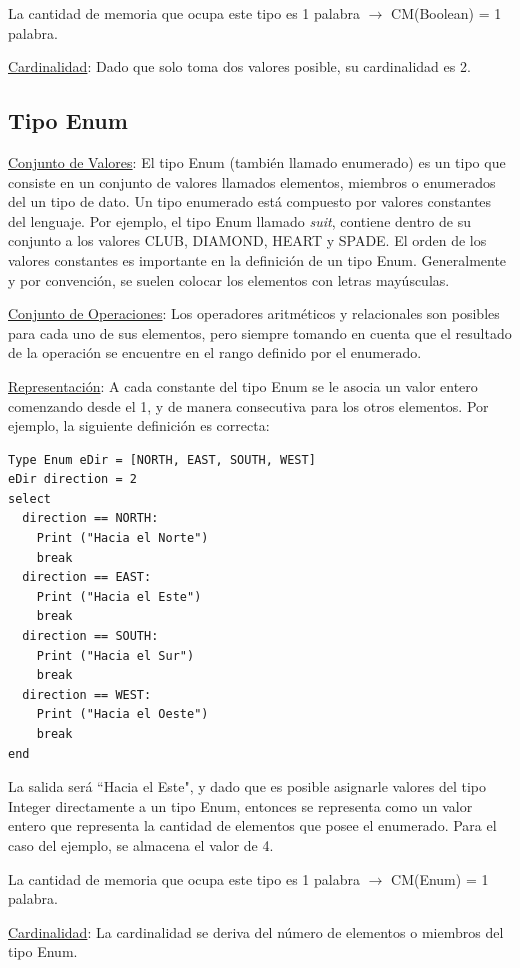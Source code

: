 La cantidad de memoria que ocupa este tipo es 1 palabra $\rightarrow$ CM(Boolean) = 1 palabra.

\underline{Cardinalidad}: Dado que solo toma dos valores posible, su cardinalidad es 2.

\subsection{Tipo Enum}

\underline{Conjunto de Valores}: El tipo Enum (también llamado enumerado) es un tipo que consiste en un conjunto de valores llamados elementos, miembros o enumerados del un tipo de dato. Un tipo enumerado está compuesto por valores constantes del lenguaje. Por ejemplo, el tipo Enum llamado \textit{suit}, contiene dentro de su conjunto a los valores CLUB, DIAMOND, HEART y SPADE. El orden de los valores constantes es importante en la definición de un tipo Enum. Generalmente y por convención, se suelen colocar los elementos con letras mayúsculas.

\underline{Conjunto de Operaciones}: Los operadores aritméticos y relacionales son posibles para cada uno de sus elementos, pero siempre tomando en cuenta que el resultado de la operación se encuentre en el rango definido por el enumerado.

\underline{Representación}: A cada constante del tipo Enum se le asocia un valor entero comenzando desde el 1, y de manera consecutiva para los otros elementos. Por ejemplo, la siguiente definición es correcta:
\begin{lstlisting}[upquote=true, language=pseudo]
Type Enum eDir = [NORTH, EAST, SOUTH, WEST]
eDir direction = 2
select
  direction == NORTH: 
    Print ("Hacia el Norte")
    break
  direction == EAST: 
    Print ("Hacia el Este")
    break
  direction == SOUTH: 
    Print ("Hacia el Sur")
    break
  direction == WEST: 
    Print ("Hacia el Oeste")
    break
end
\end{lstlisting}

La salida será ``Hacia el Este", y dado que es posible asignarle valores del tipo Integer directamente a un tipo Enum, entonces se representa como un valor entero que representa la cantidad de elementos que posee el enumerado. Para el caso del ejemplo, se almacena el valor de 4.

La cantidad de memoria que ocupa este tipo es 1 palabra $\rightarrow$ CM(Enum) = 1 palabra.

\underline{Cardinalidad}: La cardinalidad se deriva del número de elementos o miembros del tipo Enum.

